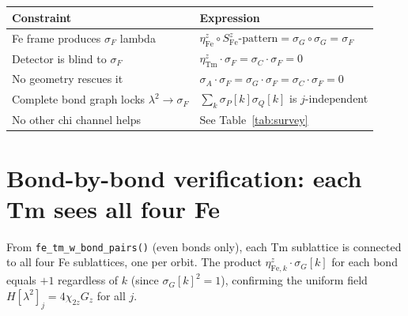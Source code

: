 \documentclass[11pt,a4paper]{article}
\newcommand{\sF}{\sigma_F}
\newcommand{\sG}{\sigma_G}
\newcommand{\sA}{\sigma_A}
\newcommand{\sC}{\sigma_C}
\newcommand{\etaz}{\eta^z}
\newcommand{\lamt}{\lambda^2}
\begin{document}
\bigskip
\begin{center}
\begin{tabular}{ll}
\toprule
Constraint & Expression \\
\midrule
Fe frame produces $\sF$ lambda & $\etaz_{\mathrm{Fe}}\circ S^z_{\mathrm{Fe}}\text{-pattern}
  = \sG\circ\sG = \sF$ \\
Detector is blind to $\sF$ & $\etaz_{\mathrm{Tm}}\cdot\sF = \sC\cdot\sF = 0$ \\
No geometry rescues it & $\sA\cdot\sF = \sG\cdot\sF = \sC\cdot\sF = 0$ \\
    Complete bond graph locks $\lamt \to \sF$ & $\sum_k \sigma_P[k]\sigma_Q[k]$ is $j$-independent \\
No other chi channel helps & See Table~\ref{tab:survey} \\
\bottomrule
\end{tabular}
\end{center}

\appendix
\section{Bond-by-bond verification: each Tm sees all four Fe}
\label{app:bonds}

From \texttt{fe\_tm\_w\_bond\_pairs()} (even bonds only), each Tm sublattice
is connected to all four Fe sublattices, one per orbit.  The product
$\eta^z_{\mathrm{Fe},k}\cdot \sG[k]$ for each bond equals $+1$ regardless
of $k$ (since $\sG[k]^2=1$), confirming the uniform field
$H[\lamt]_j = 4\chi_{2z}G_z$ for all $j$.
\end{document}
